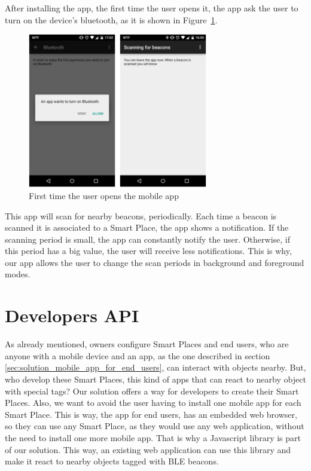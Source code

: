 After installing the app, the first time the user opens it, the app ask the user to turn on the device's bluetooth, as it is shown in Figure~\ref{fig:screenshot_clientapp_entry}.
\begin{figure}[!ht]
  \centering
    \includegraphics[width=0.7\textwidth, keepaspectratio]{images/screenshots/clientapp_entry}
    \caption[Users mobile app]{First time the user opens the mobile app}
    \label{fig:screenshot_clientapp_entry}
\end{figure}
This app will scan for nearby beacons, periodically.
Each time a beacon is scanned it is associated to a Smart Place, the app shows a notification.
If the scanning period is small, the app can constantly notify the user. Otherwise, if this period has a big value, the user will receive less notifications.
This is why, our app allows the user to change the scan periods in background and foreground modes.

\section{Developers API}
\label{sec:solution_developers_api}
As already mentioned, owners configure Smart Places and end users, who are anyone with a mobile device and an app, as the one described in section \ref{sec:solution_mobile_app_for_end_users}, can interact with objects nearby.
But, who develop these Smart Places, this kind of apps that can react to nearby object with special tags?
Our solution offers a way for developers to create their Smart Places.
Also, we want to avoid the user having to install one mobile app for each Smart Place.
This is way, the app for end users,
has an embedded web browser, so they can use any Smart Place, as they would use any web application, without the need to install one more mobile app.
That is why a Javascript library is part of our solution.
This way, an existing web application can use this library and make it react to nearby objects tagged with \gls{BLE} beacons.


